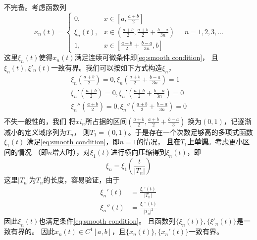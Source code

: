 \documentclass[cn]{homework}
\begin{document}
\begin{subproblem}
        \item
        不完备。考虑函数列
        \[x_n(t)=\begin{cases}
            0,&x\in[a,\frac{a+b}{2}]\\
            \xi_n(t),&x\in(\frac{a+b}{2},\frac{a+b}{2}+\frac{b-a}{3n})\\
            1,&x\in[\frac{a+b}{2}+\frac{b-a}{3n},b]
        \end{cases}
        \quad n=1,2,3,\ldots\]
        这里$\xi_n(t)$使得$x_n(t)$满足连续可微条件即\cref{eq:smooth condition}，
        且$\xi_n(t),\xi'_n(t)$一致有界。我们可以按如下方式构造$\xi_n$，
        \begin{equation}\begin{aligned}
            \label{eq:smooth condition}
            \xi_n\left(\frac{a+b}{2}\right)=0,
            \xi_n\left(\frac{a+b}{2}+\frac{b-a}{3n}\right)=1\\
            \xi_n'\left(\frac{a+b}{2}\right)=0,
            \xi_n'\left(\frac{a+b}{2}+\frac{b-a}{3n}\right)=0\\
            \xi_n''\left(\frac{a+b}{2}\right)=0,
            \xi_n''\left(\frac{a+b}{2}+\frac{b-a}{3n}\right)=0\\
        \end{aligned}\end{equation}
        不失一般性的，我们
        将$xi_n$所占据的区间$(\frac{a+b}{2},\frac{a+b}{2}+\frac{b-a}{3})$
        换为$(0,1)$，记逐渐减小的定义域序列为$T_n$，
        则$T_1=(0,1)$。于是存在一个次数足够高的多项式函数$\xi_1(t)$
        满足\cref{eq:smooth condition}，即$n=1$的情况，
        \textbf{且在$T_1$上单调}。考虑更小区间的情况
        （即$n$增大时），对$\xi_1(t)$进行横向压缩得到$\xi_n(t)$，即
        \[\xi_n=\xi_1\left(\frac t{|T_n|}\right)\]
        这里$|T_n|$为$T_n$的长度，容易验证，由于
        \[\begin{aligned}
            \xi_n'(t)&=\frac{\xi_1'(t)}{|T_n|}\\
            \xi_n''(t)&=\frac{\xi_1''(t)}{|T_n|^2}
        \end{aligned}\]
        因此$\xi_n(t)$也满足条件\cref{eq:smooth condition}。
        且函数列$\{\xi_n(t)\},\{\xi'_n(t)\}$是一致有界的。
        因此$x_n(t)\in C^1[a,b]$，且$\{x_n(t)\},\{x_n'(t)\}$一致有界。


\end{subproblem}
\end{document}
